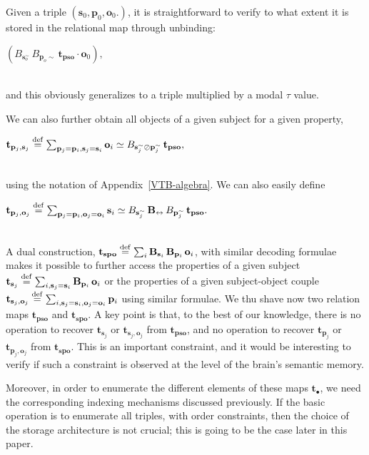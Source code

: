 \documentclass[sn-mathphys]{sn-jnl}
\newcommand{\defq}{\stackrel {\rm def}{=}}
\newcommand{\eqline}[1]{~\vspace{0.1cm}\\\centerline{$#1$}\vspace{0.1cm}\\}
\begin{document}
Given a triple $(\mathbf{s}_0,  \mathbf{p}_0,  \mathbf{o}_0.)$, it is straightforward to verify to what extent it is stored in the relational map through unbinding:
\eqline{(B_{\mathbf{s}_o^\sim} \, B_{\mathbf{p}_o\sim} \, \mathbf{t}_{\mathbf{pso}} \cdot \mathbf{o}_0),}
and this obviously generalizes to a triple multiplied by a modal $\tau$ value.

We can also further obtain all objects of a given subject for a given property,
\eqline{\mathbf{t}_{\mathbf{p}_j, \mathbf{s}_j} \defq \sum_{\mathbf{p}_j = \mathbf{p}_i, \mathbf{s}_j = \mathbf{s}_i} \mathbf{o}_i \simeq B_{\mathbf{s}_j^\sim \oslash \mathbf{p}_j^\sim} \, \mathbf{t}_{\mathbf{pso}}, }
using the notation of Appendix~\ref{VTB-algebra}. We can also easily define
\eqline{\mathbf{t}_{\mathbf{p}_j, \mathbf{o}_j}  \defq \sum_{\mathbf{p}_j
  = \mathbf{p}_i, \mathbf{o}_j = \mathbf{o}_i} \mathbf{s}_i
  \simeq B_{\mathbf{s}_j^\sim} \, \mathbf{B_{\leftrightarrow}} \, B_{\mathbf{p}_j^\sim} \, \mathbf{t}_{\mathbf{pso}}.}

A dual construction, $\mathbf{t}_{\mathbf{spo}} \defq \sum_i \mathbf{B}_{\mathbf{s}_i} \, \mathbf{B}_{\mathbf{p}_i} \, \mathbf{o}_i$, with similar decoding formulae makes it possible to further access the properties of a given subject $\mathbf{t}_{\mathbf{s}_j} \defq \sum_{i, \mathbf{s}_j = \mathbf{s}_i} \mathbf{B}_{\mathbf{p}_i} \, \mathbf{o}_i$ or the properties of a given subject-object couple $\mathbf{t}_{\mathbf{s}_j, \mathbf{o}_j} \defq \sum_{i, \mathbf{s}_j = \mathbf{s}_i, \mathbf{o}_j = \mathbf{o}_i} \mathbf{p}_i$ using similar formulae. We thu shave now two relation maps $\mathbf{t}_{\mathbf{pso}}$ and $\mathbf{t}_{\mathbf{spo}}$.
A key point is that, to the best of our knowledge, there is no operation to recover $\mathbf{t}_{\mathbf{s}_j}$ or $\mathbf{t}_{\mathbf{s}_j, \mathbf{o}_j}$ from $\mathbf{t}_{\mathbf{pso}}$, and no operation to recover $\mathbf{t}_{\mathbf{p}_j}$ or $\mathbf{t}_{\mathbf{p}_j, \mathbf{o}_j}$ from $\mathbf{t}_{\mathbf{spo}}$. This is an important constraint, and it would be interesting to verify if such a constraint is observed at the level of the brain's semantic memory.

Moreover, in order to enumerate the different elements of these maps $\mathbf{t}_{\bullet}$, we need the corresponding indexing mechanisms discussed previously. If the basic operation is to enumerate all triples, with order constraints, then the choice of the storage architecture is not crucial; this is going to be the case later in this paper.
\end{document}
